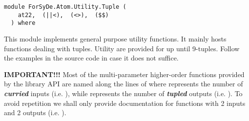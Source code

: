 \label{module:ForSyDe.Atom.Utility.Tuple}
\haddockbeginheader
{\haddockverb\begin{verbatim}
module ForSyDe.Atom.Utility.Tuple (
    at22,  (||<),  (<>),  ($$)
  ) where\end{verbatim}}
\haddockendheader

This module implements general purpose utility functions. It mainly
 hosts functions dealing with tuples. Utility are provided for up
 until 9-tuples. Follow the examples in the source code in case it
 does not suffice.\par
\textbf{IMPORTANT!!!} Most of the multi-parameter higher-order functions
 provided by the library API are named along the lines of
  where  represents the number of \textbf{\emph{curried}}
 inputs (i.e. ), while  represents the
 number of \textbf{\emph{tupled}} outputs (i.e. ). To avoid
 repetition we shall only provide documentation for functions with 2
 inputs and 2 outputs (i.e. ).\par

